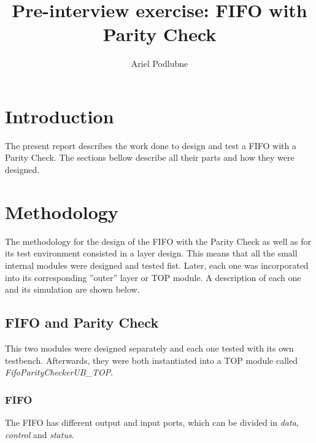 \documentclass[12pt]{article}
\begin{document}
 

\newcommand{\newtext}[1]{\textcolor[rgb]{0.55,0.47,0.06}{#1}}

\newcommand{\mytext}[1]{{\normalfont{\textit{#1}}}}
\newcommand{\fifo}{FIFO\xspace}
\newcommand{\paritycheck}{Parity Check\xspace}
\newcommand{\vhdl}{VHDL\xspace}


\title{Pre-interview exercise: FIFO with Parity Check}
\author{Ariel Podlubne}
\maketitle
 
\section{Introduction}
The present report describes the work done to design and test a \fifo with a \paritycheck. The sections bellow describe all their parts and how they were designed.
 
\section{Methodology}
The methodology for the design of the \fifo with the \paritycheck as well as for its test environment consisted in a layer design. This means that all the small internal modules were designed and tested fist. Later, each one was incorporated into its corresponding ''outer''  layer or TOP module.  A description of each one and its simulation are shown below.

\subsection{\fifo and \paritycheck}
\label{sec:fifo and paritycheck}
This two modules were designed separately and each one tested with its own testbench.  Afterwards, they were both instantiated into a TOP module called \textit{FifoParityCheckerUB\_TOP}.

\subsubsection{\fifo}
\label{subsubsection: Fifo}
The \fifo has different output and input ports, which can be divided in \textit{data}, \textit{control} and \textit{status}.
\end{document}

